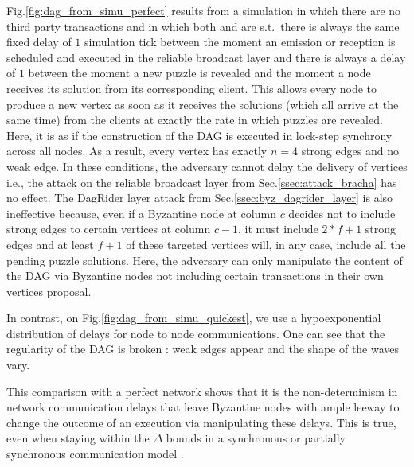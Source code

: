 Fig.\ref{fig:dag_from_simu_perfect} results from a simulation in which there are no third party transactions and in which both \textcolor{red}{\faHourglassO} and \textcolor{black}{\faClockO} are s.t.~there is always the same fixed delay of $1$ simulation tick between the moment an emission or reception is scheduled and executed in the reliable broadcast layer and there is always a delay of $1$ between the moment a new puzzle is revealed and the moment a node receives its solution from its corresponding client.
This allows every node to produce a new vertex as soon as it receives the solutions (which all arrive at the same time) from the clients at exactly the rate in which puzzles are revealed.
Here, it is as if the construction of the DAG is executed in lock-step synchrony across all nodes.
As a result, every vertex has exactly $n = 4$ strong edges and no weak edge.
In these conditions, the adversary cannot delay the delivery of vertices i.e., the attack on the reliable broadcast layer from Sec.\ref{ssec:attack_bracha} has no effect.
The DagRider layer attack from Sec.\ref{ssec:byz_dagrider_layer} is also ineffective because, even if a Byzantine node at column $c$ decides not to include strong edges to certain vertices at column $c-1$, it must include $2*f+1$ strong edges and at least $f+1$ of these targeted vertices will, in any case, include all the pending puzzle solutions.
Here, the adversary can only manipulate the content of the DAG via Byzantine nodes not including certain transactions in their own vertices proposal.

In contrast, on Fig.\ref{fig:dag_from_simu_quickest}, we use a hypoexponential distribution of delays for node to node communications. One can see that the regularity of the DAG is broken : weak edges appear and the shape of the waves vary.

This comparison with a perfect network shows that it is the non-determinism in network communication delays that leave Byzantine nodes with ample leeway to change the outcome of an execution via manipulating these delays.
This is true, even when staying within the $\Delta$ bounds in a synchronous or partially synchronous communication model \cite{consensus_in_the_presence_of_partial_synchrony,impossibility_of_distributed_consensus_with_one_faulty_process}.


